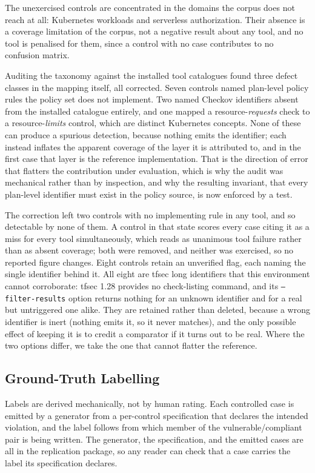 \documentclass[journal]{IEEEtran}
\begin{document}
The unexercised controls are concentrated in the domains the corpus does not reach
at all: Kubernetes workloads and serverless authorization. Their absence is a
coverage limitation of the corpus, not a negative result about any tool, and no
tool is penalised for them, since a control with no case contributes to no
confusion matrix.

Auditing the taxonomy against the installed tool catalogues found three defect
classes in the mapping itself, all corrected. Seven controls named plan-level
policy rules the policy set does not implement. Two named Checkov identifiers
absent from the installed catalogue entirely, and one mapped a
resource-\emph{requests} check to a resource-\emph{limits} control, which are
distinct Kubernetes concepts. None of these can produce a spurious detection,
because nothing emits the identifier; each instead inflates the apparent coverage
of the layer it is attributed to, and in the first case that layer is the reference
implementation. That is the direction of error that flatters the contribution under
evaluation, which is why the audit was mechanical rather than by inspection, and
why the resulting invariant, that every plan-level identifier must exist in the
policy source, is now enforced by a test.

The correction left two controls with no implementing rule in any tool, and so
detectable by none of them. A control in that state scores every case citing it as a miss for every tool
simultaneously, which reads as unanimous tool failure rather than as absent
coverage; both were removed, and neither was exercised, so no reported figure
changes. Eight controls retain an unverified flag, each naming the single
identifier behind it. All eight are tfsec long identifiers that this environment
cannot corroborate: tfsec 1.28 provides no check-listing command, and its
\texttt{--filter-results} option returns nothing for an unknown identifier and for
a real but untriggered one alike. They are retained rather than deleted, because a
wrong identifier is inert (nothing emits it, so it never matches), and the only
possible effect of keeping it is to credit a comparator if it turns out to be real.
Where the two options differ, we take the one that cannot flatter the reference.

\subsection{Ground-Truth Labelling}
\label{sec:labelling}
Labels are derived mechanically, not by human rating. Each controlled case is
emitted by a generator from a per-control specification that declares the intended
violation, and the label follows from which member of the vulnerable/compliant pair
is being written. The generator, the specification, and the emitted cases are all in
the replication package, so any reader can check that a case carries the label its
specification declares.
\end{document}
